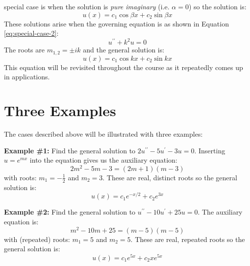 \begin{enumerate}
 special case is when the solution is \emph{pure imaginary} (i.e. $\alpha = 0$) so the solution is:
\begin{equation}
u(x) = c_1 \cos{\beta x} + c_2 \sin{\beta x}
\end{equation}
These solutions arise when the governing equation is as shown in Equation \ref{eq:special-case-2}:
\begin{equation}
u^{\prime \prime} + k^2 u = 0
\label{eq:special-case-2}
\end{equation}
The roots are $m_{1,2} = \pm ik$ and the general solution is:
\begin{equation}
u(x)=c_1 \cos{kx} + c_2 \sin{kx}
\end{equation}
This equation will be revisited throughout the course as it repeatedly comes up in applications.
\end{enumerate}

\section{Three Examples}
The cases described above will be illustrated with three examples:

\vspace{0.5cm}
\noindent\textbf{Example \#1:}
Find the general solution to $2u^{\prime \prime}-5u^{\prime}-3u = 0$. Inserting $u = e^{mx}$ into the equation gives us the auxiliary equation:
\begin{equation*}
2m^2 - 5m - 3 = (2m+1)(m-3)
\end{equation*}
with roots: $m_1 = -\frac{1}{2}$ and $m_2 = 3$.  These are real, distinct roots so the general solution is:
\begin{equation*}
u(x) = c_1e^{-x/2}+c_2e^{3x}
\end{equation*}

\vspace{0.5cm}

\noindent\textbf{Example \#2:}
Find the general solution to $u^{\prime \prime}-10u^{\prime}+25u = 0$.
The auxiliary equation is:
\begin{equation*}
m^2-10m+25 = (m-5)(m-5)
\end{equation*}
with (repeated) roots: $m_1 = 5$ and $m_2 = 5$.  These are real, repeated roots so the general solution is:
\begin{equation*}
u(x) = c_1e^{5x} + c_2xe^{5x}
\end{equation*}

\vspace{0.5cm}

